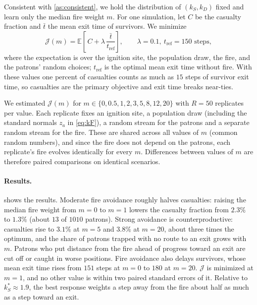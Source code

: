 Consistent with \cref{as:consistent}, we hold the distribution of $(k_S, k_D)$ fixed and
learn only the median fire weight $m$. For one simulation, let $C$ be the casualty
fraction and $\bar t$ the mean exit time of survivors. We minimize
\begin{equation}\label{eq:fire_objective}
  \mathcal{J}(m) = \mathbb{E}\left[\, C + \lambda\, \frac{\bar t}{t_{\text{ref}}} \right],
  \qquad \lambda = 0.1,\ t_{\text{ref}} = 150 \text{ steps},
\end{equation}
where the expectation is over the ignition site, the population draw, the fire, and the
patrons' random choices; $t_{\text{ref}}$ is the optimal mean exit time without fire. With
these values one percent of casualties counts as much as $15$ steps of survivor exit time,
so casualties are the primary objective and exit time breaks near-ties.

We estimated $\mathcal{J}(m)$ for $m \in \{0, 0.5, 1, 2, 3, 5, 8, 12, 20\}$ with $R = 50$
replicates per value. Each replicate fixes an ignition site, a population draw (including
the standard normals $z_a$ in \cref{eq:kF}), a random stream for the patrons and a separate
random stream for the fire. These are shared across all values of $m$ (common random
numbers), and since the fire does not depend on the patrons, each replicate's fire evolves
identically for every $m$. Differences between values of $m$ are therefore paired
comparisons on identical scenarios.

\paragraph{Results.}  shows the results. %
Moderate fire avoidance roughly halves casualties: raising the median fire weight from
$m = 0$ to $m = 1$ lowers the casualty fraction from $2.3\%$ to $1.3\%$ (about $13$ of
$1010$ patrons). Strong avoidance is counterproductive: casualties rise to $3.1\%$ at
$m = 5$ and $3.8\%$ at $m = 20$, about three times the optimum, and the share of patrons
trapped with no route to an exit grows with $m$. Patrons who put distance from the fire
ahead of progress toward an exit are cut off or caught in worse positions. Fire avoidance
also delays survivors, whose mean exit time rises from $151$ steps at $m = 0$ to $180$ at
$m = 20$. $\mathcal{J}$ is minimized at $m = 1$, and no other value is within two paired
standard errors of it. Relative to $k_S^* \approx 1.9$, the best response weights a step
away from the fire about half as much as a step toward an exit.


